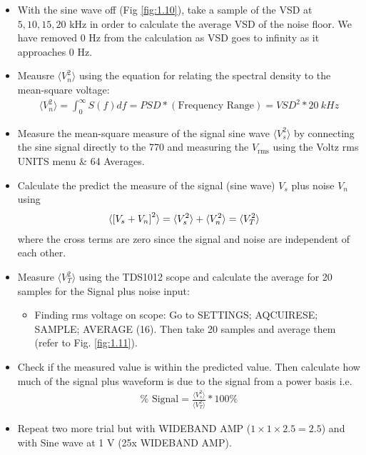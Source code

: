 \documentclass[../main.tex]{subfiles}
\begin{document}
\begin{itemize}
    \item With the sine wave off (Fig \ref{fig:1.10}), take a sample of the VSD at $5, 10, 15, 20$ kHz in order to calculate the average VSD of the noise floor.
    We have removed 0 Hz from the calculation as VSD goes to infinity as it approaches 0 Hz.
    \item Meausre $\langle V_n^2 \rangle$ using the equation for relating the spectral density to the mean-square voltage:
    \begin{align*}
        \langle V_n^2 \rangle = \int_0^\infty S(f) df = PSD * (\textrm{Frequency Range}) = VSD^2 * \qty{20}{kHz}
    \end{align*}
    \item Measure the mean-square measure of the signal sine wave $\langle V_s^2 \rangle$ by connecting the sine signal directly to the 770 and measuring the $V_\text{rms}$ using the Voltz rms UNITS menu \& 64 Averages.
    \item Calculate the predict the measure of the signal (sine wave) $V_s$ plus noise $V_n$ using
    \begin{align*}
        \langle \qt[
            V_s + V_n
        ]^2 \rangle &= \langle V_s^2 \rangle + \langle V_n^2 \rangle = \langle V_T^2 \rangle
    \end{align*}
    where the cross terms are zero since the signal and noise are independent of each other.
    \item Measure $\langle V_T^2 \rangle$ using the TDS1012 scope and calculate the average for 20 samples for the Signal plus noise input:
    \begin{itemize}
        \item Finding rms voltage on scope: Go to SETTINGS; AQCUIRESE; SAMPLE; AVERAGE (16). Then take 20 samples and average them (refer to Fig. \ref{fig:1.11}).
    \end{itemize}
    \item Check if the measured value is within the predicted value. Then calculate how much of the signal plus waveform is due to the signal from a power basis i.e. 
    \begin{align*}
        \% \text{ Signal} = \frac{\langle V_s^2 \rangle}{\langle V_T^2 \rangle} * 100\%
    \end{align*}
    \item Repeat two more trial but with WIDEBAND AMP ($1 \times 1 \times 2.5 = 2.5$) and with Sine wave at 1 V (25x WIDEBAND AMP).
\end{itemize}
\end{document}
